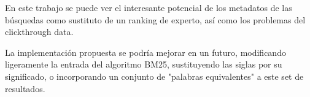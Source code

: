 \documentclass[a4paper,12pt]{article}
\begin{document}
	En este trabajo se puede ver el interesante potencial de los metadatos de las búsquedas como sustituto de un ranking de experto, así como los problemas del clickthrough data.
	
	La implementación propuesta se podría mejorar en un futuro, modificando ligeramente la entrada del algoritmo BM25, sustituyendo las siglas por su significado, o incorporando un conjunto de "palabras equivalentes" a este set de resultados.

	
	
	
	
\end{document}
